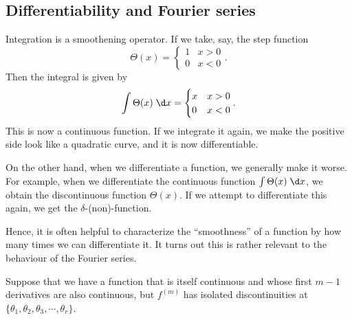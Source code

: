 \documentclass[a4paper]{article}
\begin{document}
\subsection{Differentiability and Fourier series}
Integration is a smoothening operator. If we take, say, the step function
\[
  \Theta(x) =
  \begin{cases}
    1 & x > 0\\
    0 & x < 0
  \end{cases}.
\]
Then the integral is given by
\[
  \int \Theta(x)\;\d x =
  \begin{cases}
    x & x > 0\\
    0 & x < 0
  \end{cases}.
\]
This is now a continuous function. If we integrate it again, we make the positive side look like a quadratic curve, and it is now differentiable.
\begin{center}
\end{center}
On the other hand, when we differentiate a function, we generally make it worse. For example, when we differentiate the continuous function $\int \Theta (x)\;\d x$, we obtain the discontinuous function $\Theta(x)$. If we attempt to differentiate this again, we get the $\delta$-(non)-function.

Hence, it is often helpful to characterize the ``smoothness'' of a function by how many times we can differentiate it. It turns out this is rather relevant to the behaviour of the Fourier series.

Suppose that we have a function that is itself continuous and whose first $m - 1$ derivatives are also continuous, but $f^{(m)}$ has isolated discontinuities at $\{\theta_1, \theta_2, \theta_3, \cdots, \theta_r\}$.
\end{document}
